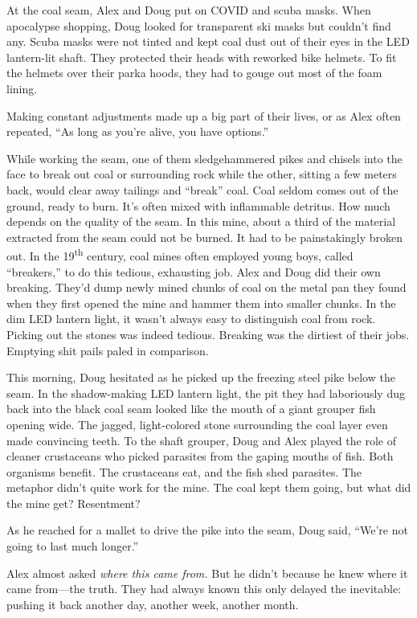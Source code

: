 At the coal seam, Alex and Doug put on COVID and scuba masks. When
apocalypse shopping, Doug looked for transparent ski masks but couldn't
find any. Scuba masks were not tinted and kept coal dust out of their
eyes in the LED lantern-lit shaft. They protected their heads with
reworked bike helmets. To fit the helmets over their parka hoods, they
had to gouge out most of the foam lining.

Making constant adjustments made up a big part of their lives, or as
Alex often repeated, ``As long as you're alive, you have options.''

While working the seam, one of them sledgehammered pikes and chisels
into the face to break out coal or surrounding rock while the other,
sitting a few meters back, would clear away tailings and ``break'' coal.
Coal seldom comes out of the ground, ready to burn. It's often mixed
with inflammable detritus. How much depends on the quality of the seam.
In this mine, about a third of the material extracted from the seam
could not be burned. It had to be painstakingly broken out. In the
19\textsuperscript{th} century, coal mines often employed young boys,
called ``breakers,'' to do this tedious, exhausting job. Alex and Doug
did their own breaking. They'd dump newly mined chunks of coal on the
metal pan they found when they first opened the mine and hammer them
into smaller chunks. In the dim LED lantern light, it wasn't always easy
to distinguish coal from rock. Picking out the stones was indeed
tedious. Breaking was the dirtiest of their jobs. Emptying shit pails
paled in comparison.

This morning, Doug hesitated as he picked up the freezing steel pike
below the seam. In the shadow-making LED lantern light, the pit they had
laboriously dug back into the black coal seam looked like the mouth of a
giant grouper fish opening wide. The jagged, light-colored stone
surrounding the coal layer even made convincing teeth. To the shaft
grouper, Doug and Alex played the role of cleaner crustaceans who picked
parasites from the gaping mouths of fish. Both organisms benefit. The
crustaceans eat, and the fish shed parasites. The metaphor didn't quite
work for the mine. The coal kept them going, but what did the mine get?
Resentment?

As he reached for a mallet to drive the pike into the seam, Doug said,
``We're not going to last much longer.''

Alex almost asked \emph{where this came from.} But he didn't because he
knew where it came from---the truth. They had always known this only
delayed the inevitable: pushing it back another day, another week,
another month.

